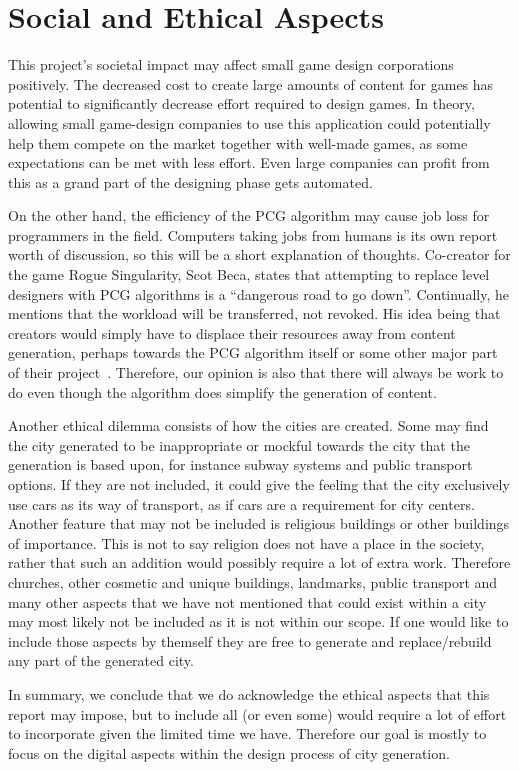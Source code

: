 \section{Social and Ethical Aspects}
This project's societal impact may affect small game design corporations positively.
The decreased cost to create large amounts of content for games has potential to significantly decrease effort required to design games.
In theory, allowing small game-design companies to use this application could potentially help them compete on the market together with well-made games, as some expectations can be met with less effort.
Even large companies can profit from this as a grand part of the designing phase gets automated.

On the other hand, the efficiency of the PCG algorithm may cause job loss for programmers in the field.
Computers taking jobs from humans is its own report worth of discussion, so this will be a short explanation of thoughts.
Co-creator for the game Rogue Singularity, Scot Beca, states that attempting to replace level designers with PCG algorithms is a ``dangerous road to go down''.
Continually, he mentions that the workload will be transferred, not revoked.
His idea being that creators would simply have to displace their resources away from content generation, perhaps towards the PCG algorithm itself or some other major part of their project~\cite{Gamasutra}.
Therefore, our opinion is also that there will always be work to do even though the algorithm does simplify the generation of content.

Another ethical dilemma consists of how the cities are created.
Some may find the city generated to be inappropriate or mockful towards the city that the generation is based upon, for instance subway systems and public transport options.
If they are not included, it could give the feeling that the city exclusively use cars as its way of transport, as if cars are a requirement for city centers.
Another feature that may not be included is religious buildings or other buildings of importance.
This is not to say religion does not have a place in the society, rather that such an addition would possibly require a lot of extra work.
Therefore churches, other cosmetic and unique buildings, landmarks, public transport and many other aspects that we have not mentioned that could exist within a city may most likely not be included as it is not within our scope.
If one would like to include those aspects by themself they are free to generate and replace/rebuild any part of the generated city.

In summary, we conclude that we do acknowledge the ethical aspects that this report may impose, but to include all (or even some) would require a lot of effort to incorporate given the limited time we have.
Therefore our goal is mostly to focus on the digital aspects within the design process of city generation.